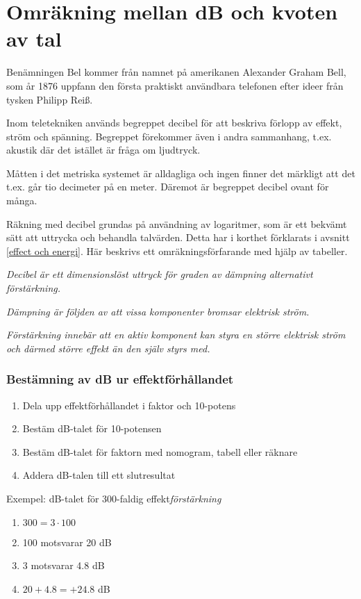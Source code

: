 \chapter{Omräkning mellan dB och kvoten av tal}
\label{decibel}

Benämningen Bel kommer från namnet på amerikanen Alexander Graham
Bell, som år 1876 uppfann den första praktiskt användbara telefonen
efter ideer från tysken Philipp Reiß.

Inom teletekniken används begreppet decibel för att beskriva förlopp
av effekt, ström och spänning.  Begreppet förekommer även i andra
sammanhang, t.ex. akustik där det istället är fråga om ljudtryck.

Måtten i det metriska systemet är alldagliga och ingen finner det
märkligt att det t.ex. går tio decimeter på en meter. Däremot är
begreppet decibel ovant för många.

Räkning med decibel grundas på användning av logaritmer, som är ett
bekvämt sätt att uttrycka och behandla talvärden.  Detta har i
korthet förklarats i avsnitt \ref{effect och energi}.  Här beskrivs ett
omräkningsförfarande med hjälp av tabeller.

\emph{Decibel är ett dimensionslöst uttryck för graden av dämpning
  alternativt förstärkning.}

\emph{Dämpning är följden av att vissa komponenter bromsar elektrisk
  ström.}

\emph{Förstärkning innebär att en aktiv komponent kan styra en större
  elektrisk ström och därmed större effekt än den själv styrs med.}

\subsection{Bestämning av dB ur effektförhållandet}

\begin{enumerate}
\item Dela upp effektförhållandet i faktor och 10-potens
\item Bestäm dB-talet för 10-potensen
\item Bestäm dB-talet för faktorn med nomogram, tabell eller räknare
\item Addera dB-talen till ett slutresultat
\end{enumerate}

Exempel: dB-talet för 300-faldig effekt\emph{förstärkning}
\begin{enumerate}
\item \(300 = 3 \cdot 100\)
\item 100 motsvarar 20 dB
\item 3 motsvarar 4.8 dB
\item \(20 + 4.8 = +24.8\) dB
\end{enumerate}

